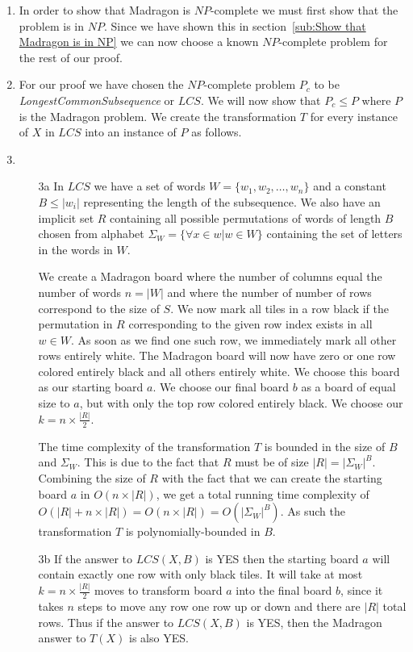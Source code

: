 \documentclass[12pt]{article}
\begin{document}
\begin{enumerate}
    \item
    In order to show that Madragon is $NP$-complete we must first show that the problem is in $NP$. Since we have shown this in section~\ref{sub:Show that Madragon is in NP} we can now choose a
    known $NP$-complete problem for the rest of our proof.

    \item
    For our proof we have chosen the $NP$-complete problem $P_c$ to be  \textit{LongestCommonSubsequence} or $LCS$. We will now show that $P_c \leq P$ where $P$ is the Madragon problem.
    We create the transformation $T$ for every instance of $X$ in $LCS$ into an instance of $P$ as follows.

    \item
    \begin{enumerate}
        \item[3a]
        In $LCS$ we have a set of words $W = \{w_1, w_2, \dots, w_n\}$ and a constant $B \leq |w_i|$ representing the length of the subsequence.
        We also have an implicit set $R$ containing all possible permutations of words of length $B$ chosen from alphabet $\Sigma_W = \{\forall x \in w | w \in W\}$ containing the set of letters in the words in $W$.

        We create a Madragon board where the number of columns equal the number of words $n = |W|$ and where the number of number of rows correspond to the size of $S$. We now mark all tiles in a row black if the permutation in $R$ corresponding to the given row index exists in all $w \in W$.
        As soon as we find one such row, we immediately mark all other rows entirely white.
        The Madragon board will now have zero or one row colored entirely black and all others entirely white. We choose this board as our starting board $a$. We choose our final board $b$ as a board of equal size to $a$, but with only the top row colored entirely black. We choose our $k = n\times\frac{|R|}{2}$.

        The time complexity of the transformation $T$ is bounded in the size of $B$ and $\Sigma_W$. This is due to the fact that $R$ must be of size $|R| = |\Sigma_W|^B$. Combining the size of $R$ with the fact that we can create the starting board $a$ in $O(n \times |R|)$, we get a total running time complexity of $O(|R|+n \times |R|) = O(n \times |R|) = O(|\Sigma_W|^B)$. As such the transformation $T$ is polynomially-bounded in $B$.

        \item[3b]
        If the answer to $LCS(X, B)$ is YES then the starting board $a$ will contain exactly one row with only black tiles. It will take at most $k = n\times\frac{|R|}{2}$ moves to transform board $a$ into the final board $b$, since it takes $n$ steps to move any row one row up or down and there are $|R|$ total rows. Thus if the answer to $LCS(X, B)$ is YES, then the Madragon answer to $T(X)$ is also YES.


\end{enumerate}
\end{enumerate}
\end{document}
